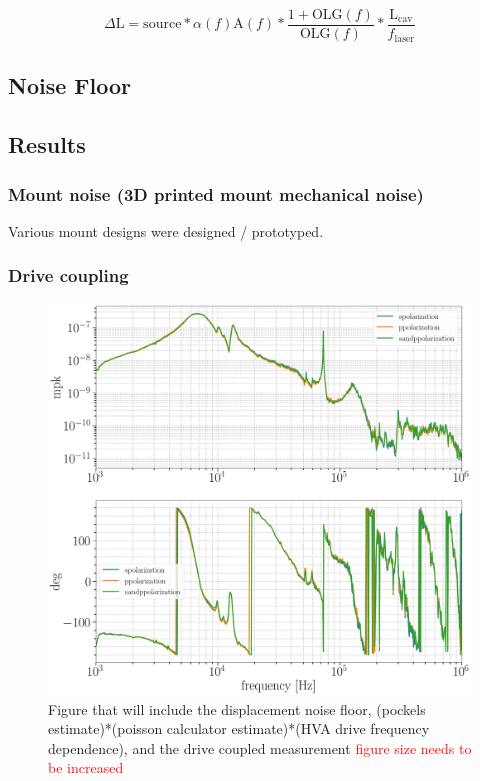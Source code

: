 $$\Delta \mathrm{L} = \mathrm{source}*\alpha(f) \mathrm{A}(f)*\frac{1+\mathrm{OLG}(f)}{\mathrm{OLG}(f)}*\frac{\mathrm{L_{cav}}}{f_\mathrm{laser}}$$

\subsection{Noise Floor}


\subsection{Results}

\subsubsection{Mount noise (3D printed mount mechanical noise)}
Various mount designs were designed / prototyped.

\subsubsection{Drive coupling}

\begin{figure}[H]
\includegraphics[width=\textwidth]{figs/ALGAAS/cav_polarization_test.png}
\caption{Figure that will include the displacement noise floor, (pockels estimate)*(poisson calculator estimate)*(HVA drive frequency dependence), and the drive coupled measurement \textcolor{red}{figure size needs to be increased}}
\label{fig:measurement_sum}
\end{figure}

